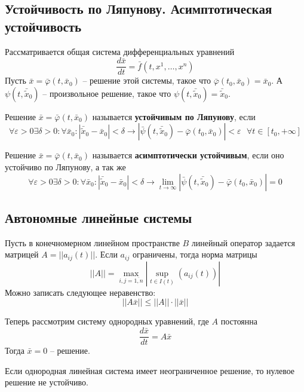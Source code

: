 
\subsection{Устойчивость по Ляпунову. Асимптотическая устойчивость}
Рассматривается общая система дифференциальных уравнений
\begin{equation}
	\frac{d\bar{x}}{dt} = \bar{f}(t, x^1, \dots, x^n)
\end{equation}
Пусть $\bar{x} = \bar{\varphi}(t, \bar{x}_0)$ -- решение этой системы, такое что $\bar{\varphi}(t_0, \bar{x}_0) = \bar{x}_0$. А $\psi(t, \bar{\tilde{x}}_0)$ -- произвольное решение, такое что $\psi(t, \bar{\tilde{x}}_0) = \bar{\tilde{x}}_0$.
\begin{definition}
	Решение $\bar{x} = \bar{\varphi}(t, \bar{x}_0)$ называется \textbf{устойчивым по Ляпунову}, если
	\[
		\forall \varepsilon >0\exists \delta > 0:\forall \bar{x}_0: |\bar{\tilde{x}}_0 - \bar{x}_0|<\delta \to |\bar{\psi}(t, \bar{\tilde{x}}_0) -  \bar{\varphi}(t_0, \bar{x}_0)|<\varepsilon\text{ } \forall t\in[t_0, +\infty]
	\]
\end{definition}
	
\begin{definition}
	Решение $\bar{x} = \bar{\varphi}(t, \bar{x}_0)$ называется \textbf{асимптотически устойчивым}, если оно устойчиво по Ляпунову, а так же
	\[
		\forall \varepsilon > 0\exists \delta>0:\forall \bar{x}_0: |\bar{\tilde{x}}_0 - \bar{x}_0|<\delta \to \lim_{t\to\infty}|\bar{\psi}(t, \bar{\tilde{x}}_0) -  \bar{\varphi}(t_0, \bar{x}_0)|=0
	\]
\end{definition}

\subsection{Автономные линейные системы}

Пусть в конечномерном линейном пространстве $B$ линейный оператор задается матрицей $A=||a_{ij}(t)||$. Если $a_{ij}$ ограничены, тогда норма матрицы 
\[
	||A|| = \max_{i,j =\overline{1,n}}|\sup_{t\in I(t)}(a_{ij}(t))|
\]
Можно записать следующее неравенство:
\[
	||A\bar{x}||\leq ||A||\cdot||\bar{x}||
\]

Теперь рассмотрим систему однородных уравнений, где $A$ постоянна
\begin{equation}
	\frac{d\bar{x}}{dt} = A\bar{x}
	\label{equ:issue12sys}
\end{equation}
Тогда $\bar{x} = 0$ -- решение.

\begin{lemma}
	Если однородная линейная система имеет неограниченное решение, то нулевое решение не устойчиво.
\end{lemma}

